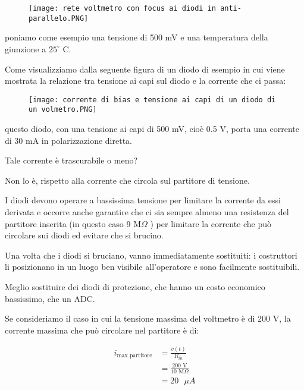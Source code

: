 \begin{figure}[h]
    \centering
    \texttt{[image: rete voltmetro con focus ai diodi in anti-parallelo.PNG]}
\end{figure}

poniamo come esempio una tensione di 500 mV e una temperatura della giunzione a $25^{\circ}$ C. \newline 

\newpage 

Come visualizziamo dalla seguente figura  di un diodo di esempio in cui viene mostrata la relazione tra tensione ai capi sul diodo e la corrente che ci passa: 

\begin{figure}[h]
    \centering
    \texttt{[image: corrente di bias e tensione ai capi di un diodo di un volmetro.PNG]}
\end{figure}

questo diodo, con una tensione ai capi di 500 mV, cioè 0.5 V, porta una corrente di 30 mA in polarizzazione diretta. \newline 

Tale corrente è trascurabile o meno? \newline 

Non lo è, rispetto alla corrente che circola sul partitore di tensione. \newline 

I diodi devono operare a bassissima tensione per limitare la corrente da essi derivata e occorre anche garantire che ci sia sempre almeno 
una resistenza del partitore inserita (in questo caso 9 M$\Omega$ ) per limitare la corrente che può circolare sui diodi ed evitare che si brucino. \newline 

Una volta che i diodi si bruciano, vanno immediatamente sostituiti: i costruttori li posizionano in un luogo ben visibile all'operatore e sono facilmente sostituibili. \newline 

Meglio sostituire dei diodi di protezione, che hanno un costo economico bassissimo, che un ADC. \newline 

Se consideriamo il caso in cui la tensione massima del voltmetro è di 200 V, la corrente massima che può circolare nel partitore è di: 

{
    \Large 
    \begin{equation}
        \begin{split}
            i_{\text{max partitore}}
            &= 
            \frac{v(t)}{R_{in}}
            \\
            &= 
            \frac{200 \text{ V}}{10 \text{ M}\Omega}
            \\
            &= 
            20 \text{ }\mu A
        \end{split}
    \end{equation}
}

